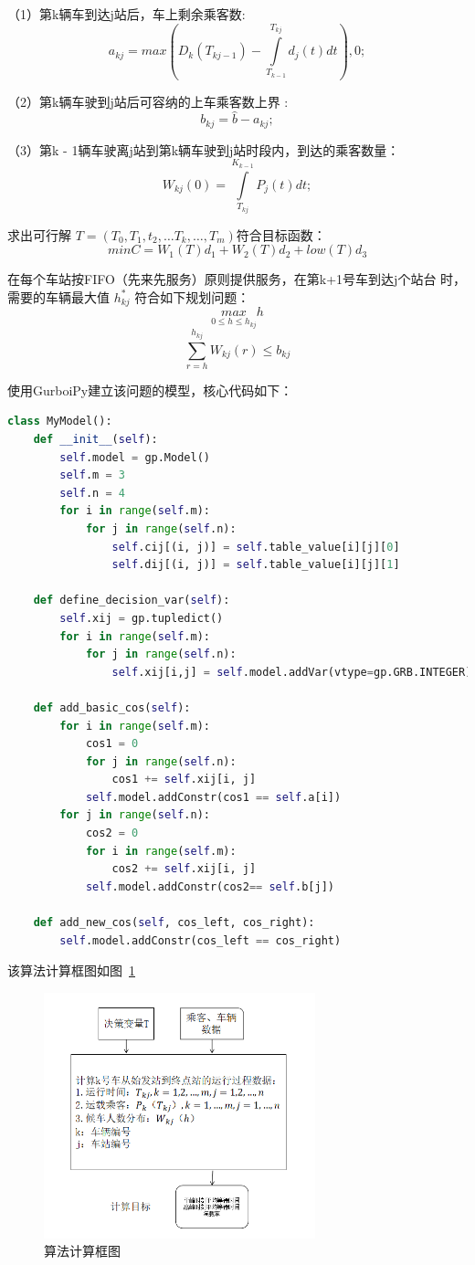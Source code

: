 （1）第k辆车到达j站后，车上剩余乘客数:
$$
a_{kj} = max{(D_k(T_{kj-1}) - \int\limits_{T_{k-1}}^{T_{kj}}d_j(t)dt ), 0};
$$

（2）第k辆车驶到j站后可容纳的上车乘客数上界 :
$$
b_{kj} = \hat{b} - a_{kj};
$$

（3）第k - 1辆车驶离j站到第k辆车驶到j站时段内，到达的乘客数量：
$$
W_{kj}(0) = \int\limits_{T_{kj}}^{K_{k-1}}P_j(t)dt;
$$

求出可行解 $T = (T_0,T_1,t_2,…T_k,…,T_m)$符合目标函数：
$$
min C = W_1(T)d_1+W_2(T)d_2 + low(T)d_3
$$

在每个车站按FIFO（先来先服务）原则提供服务，在第k+1号车到达j个站台
时，需要的车辆最大值 $h_{kj}^*$ 符合如下规划问题：
$$
\underset{0 \le h \le h_{kj}}{max} h  
$$
$$
\sum_{r=h}^{h_{kj}}W_{kj}(r) \le b_{kj}
$$


使用GurboiPy建立该问题的模型，核心代码如下：
\begin{lstlisting}[breaklines=true,language=Python]
    class MyModel():
    def __init__(self):
        self.model = gp.Model()
        self.m = 3
        self.n = 4
        for i in range(self.m):
            for j in range(self.n):
                self.cij[(i, j)] = self.table_value[i][j][0]
                self.dij[(i, j)] = self.table_value[i][j][1]

    def define_decision_var(self):
        self.xij = gp.tupledict()
        for i in range(self.m):
            for j in range(self.n):
                self.xij[i,j] = self.model.addVar(vtype=gp.GRB.INTEGER)

    def add_basic_cos(self):
        for i in range(self.m):
            cos1 = 0
            for j in range(self.n):
                cos1 += self.xij[i, j]
            self.model.addConstr(cos1 == self.a[i])
        for j in range(self.n):
            cos2 = 0
            for i in range(self.m):
                cos2 += self.xij[i, j]
            self.model.addConstr(cos2== self.b[j])

    def add_new_cos(self, cos_left, cos_right):
        self.model.addConstr(cos_left == cos_right)
\end{lstlisting}

该算法计算框图如图~\ref{11}~
\begin{figure}[htbp!]
    \center
    \includegraphics[width=0.7\textwidth]{figs/chap03/k.png}
    \caption{算法计算框图}
    \label{11}
\end{figure}
